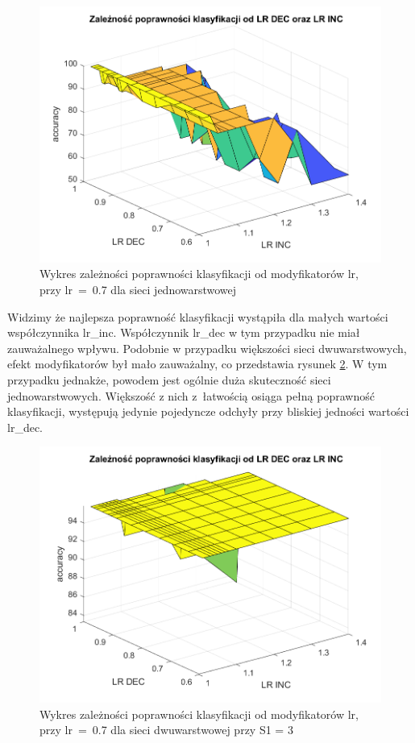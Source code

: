 \documentclass[12pt,twoside]{article}
\begin{document}
\begin{figure}[ht]
	\centering
	\includegraphics[width=16cm]{figures/IncDec_1.png}
	\caption{Wykres zależności poprawności klasyfikacji od modyfikatorów lr, przy lr~=~0.7 dla sieci jednowarstwowej}
	\label{Fig:IncDec1}
\end{figure}

Widzimy że najlepsza poprawność klasyfikacji wystąpiła dla małych wartości współczynnika lr\_inc.
Współczynnik lr\_dec w tym przypadku nie miał zauważalnego wpływu.
Podobnie w przypadku większości sieci dwuwarstwowych, efekt modyfikatorów był mało zauważalny, co przedstawia rysunek \ref{Fig:IncDec2}.
W tym przypadku jednakże, powodem jest ogólnie duża skuteczność sieci jednowarstwowych.
Większość z nich z~łatwością osiąga pełną poprawność klasyfikacji, występują jedynie pojedyncze odchyły przy bliskiej jedności wartości lr\_dec.

\begin{figure}[ht]
	\centering
	\includegraphics[width=16cm]{figures/IncDec_2.png}
	\caption{Wykres zależności poprawności klasyfikacji od modyfikatorów lr, przy lr~=~0.7 dla sieci dwuwarstwowej przy S1 = 3}
	\label{Fig:IncDec2}
\end{figure}
\end{document}

